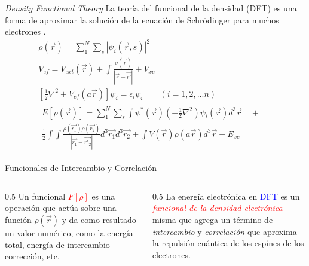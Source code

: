 \documentclass{beamer}
\begin{document}
\begin{frame}{\textit{Density Functional Theory}}
La teoría del funcional de la densidad (DFT) es una forma de aproximar la solución de la ecuación de Schrödinger para muchos electrones \cite{kohn1965self}.
\begin{gather}
       \rho(\Vec{r})=\sum_{1}^{N}\sum_{s}|\psi_{i}(\Vec{r},s)|^{2} \\
       V_{ef}=V_{ext}(\Vec{r})+\int \frac{\rho(\Vec{r})}{|\Vec{r}-\Vec{r'}|}+V_{xc} \\
       \left[ \frac{1}{2}\nabla^{2} +V_{ef}(a\Vec{r}) \right] \psi_{i}=\epsilon_{i}\psi_{i} \quad \quad (i=1,2, ... n) \\
       \begin{array}{c}
          E[ \rho(\Vec{r})]=\sum_{1}^{N}\sum_{s} \int \psi^{*}(\Vec{r}) \left( -\frac{1}{2}\nabla^{2} \right) \psi_{i}(\Vec{r})d^{3}\Vec{r} \quad + \quad \\ \frac{1}{2} \int \int  \frac{\rho(\Vec{r_{1}})\rho(\Vec{r_{2}})}{|\Vec{r_{1}}-\Vec{r'_{2}}|}d^{3}\Vec{r_{1}} d^{3}\Vec{r_{2}} + \int V(\Vec{r})\rho(a\Vec{r})d^{3}\Vec{r} + E_{xc}
       \end{array}
\end{gather}
\end{frame}
\begin{frame}{Funcionales de Intercambio y Correlación}

\begin{columns}
\begin{column}{0.5\textwidth}
\justifying
Un funcional \textcolor{red}{$F[\rho]$} es una operación que actúa sobre una función $\rho(\vec{r})$ y da como resultado un valor numérico, como la energía total, energía de intercambio-corrección, etc.
\end{column}

\begin{column}{0.5\textwidth}
\justifying
La energía electrónica en \textcolor{blue}{DFT} es un \textit{\textcolor{red}{funcional de la densidad electrónica}} misma que agrega un término de \textit{intercambio} y \textit{correlación} que aproxima la repulsión cuántica de los espínes de los electrones.
\end{column}
\end{columns}
\end{frame}
\end{document}
